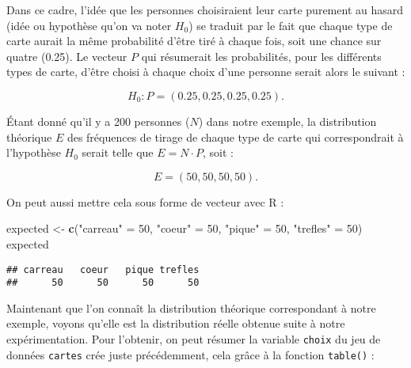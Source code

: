 \documentclass[
  french,
]{book}
\newenvironment{Shaded}{\begin{snugshade}}{\end{snugshade}}
\newcommand{\CommentTok}[1]{\textcolor[rgb]{0.56,0.35,0.01}{\textit{#1}}}
\newcommand{\DecValTok}[1]{\textcolor[rgb]{0.00,0.00,0.81}{#1}}
\newcommand{\KeywordTok}[1]{\textcolor[rgb]{0.13,0.29,0.53}{\textbf{#1}}}
\newcommand{\NormalTok}[1]{#1}
\newcommand{\OperatorTok}[1]{\textcolor[rgb]{0.81,0.36,0.00}{\textbf{#1}}}
\newcommand{\StringTok}[1]{\textcolor[rgb]{0.31,0.60,0.02}{#1}}
\begin{document}
Dans ce cadre, l'idée que les personnes choisiraient leur carte purement au hasard (idée ou hypothèse qu'on va noter \(H_{0}\)) se traduit par le fait que chaque type de carte aurait la même probabilité d'être tiré à chaque fois, soit une chance sur quatre (0.25). Le vecteur \(P\) qui résumerait les probabilités, pour les différents types de carte, d'être choisi à chaque choix d'une personne serait alors le suivant :

\[H_{0} : P = (0.25, 0.25, 0.25, 0.25).\]

Étant donné qu'il y a 200 personnes (\(N\)) dans notre exemple, la distribution théorique \(E\) des fréquences de tirage de chaque type de carte qui correspondrait à l'hypothèse \(H_{0}\) serait telle que \(E = N \cdot P\), soit :

\[E = (50, 50, 50, 50).\]

On peut aussi mettre cela sous forme de vecteur avec R :

\begin{Shaded}
\begin{Highlighting}[]
\NormalTok{expected <-}\StringTok{ }\KeywordTok{c}\NormalTok{(}\StringTok{"carreau"}\NormalTok{ =}\StringTok{ }\DecValTok{50}\NormalTok{, }\StringTok{"coeur"}\NormalTok{ =}\StringTok{ }\DecValTok{50}\NormalTok{, }\StringTok{"pique"}\NormalTok{ =}\StringTok{ }\DecValTok{50}\NormalTok{, }\StringTok{"trefles"}\NormalTok{ =}\StringTok{ }\DecValTok{50}\NormalTok{)}
\NormalTok{expected}
\end{Highlighting}
\end{Shaded}

\begin{verbatim}
## carreau   coeur   pique trefles 
##      50      50      50      50
\end{verbatim}

Maintenant que l'on connaît la distribution théorique correspondant à notre exemple, voyons qu'elle est la distribution réelle obtenue suite à notre expérimentation. Pour l'obtenir, on peut résumer la variable \texttt{choix} du jeu de données \texttt{cartes} crée juste précédemment, cela grâce à la fonction \texttt{table()} :

\begin{Shaded}
\end{Shaded}
\end{document}
